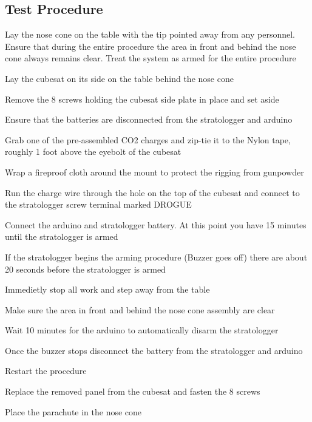 \subsection{Test Procedure}
\begin{checklist}
    \item \auth{} Lay the nose cone on the table with the tip pointed away from any personnel. Ensure that during the entire procedure the area in front and behind the nose cone always remains clear. Treat the system as armed for the entire procedure
    \item \auth{} Lay the cubesat on its side on the table behind the nose cone
    \item \auth{} Remove the 8 screws holding the cubesat side plate in place and set aside
    \item \auth{} Ensure that the batteries are disconnected from the stratologger and arduino
    \item \auth{} Grab one of the pre-assembled CO2 charges and zip-tie it to the Nylon tape, roughly 1 foot above the eyebolt of the cubesat
    \item \auth{} Wrap a fireproof cloth around the mount to protect the rigging from gunpowder
    \item \auth{} Run the charge wire through the hole on the top of the cubesat and connect to the stratologger screw terminal marked DROGUE
    \item \auth{} Connect the arduino and stratologger battery. At this point you have 15 minutes until the stratologger is armed
\item \auth{} If the stratologger begins the arming procedure (Buzzer goes off) there are about 20 seconds before the stratologger is armed
\begin{checklist}
    \item {} Immedietly stop all work and step away from the table
    \item {} Make sure the area in front and behind the nose cone assembly are clear
    \item {} Wait 10 minutes for the arduino to automatically disarm the stratologger
    \item {} Once the buzzer stops disconnect the battery from the stratologger and arduino
    \item {} Restart the procedure
\end{checklist}
    \item \auth{} Replace the removed panel from the cubesat and fasten the 8 screws
    \item \auth{} Place the parachute in the nose cone

\end{checklist}
